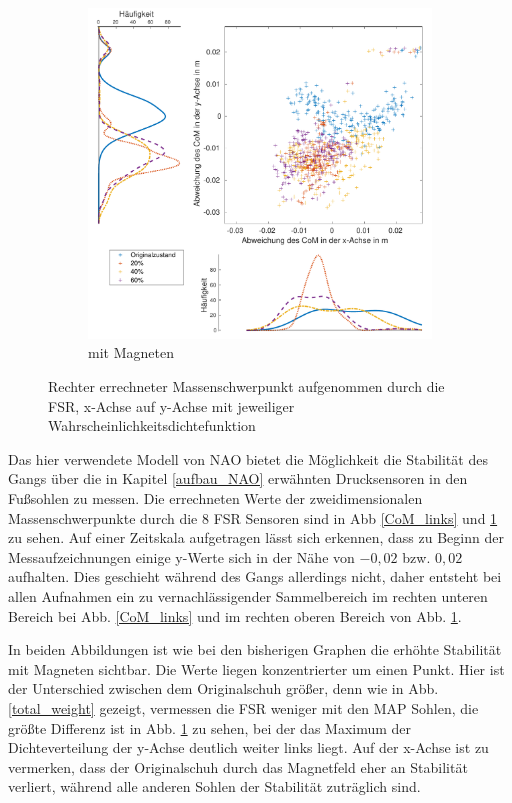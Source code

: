 \begin{figure}[tb]
\begin{adjustwidth}{-0.2\linewidth}{-0.2\linewidth}
\begin{subfigure}[c]{.45\linewidth}
			\includegraphics[width=\linewidth]{Bilder/rechts_CoM_mitM.pdf}
			\caption{mit Magneten}
			\vspace{5pt}
		\end{subfigure}
	\end{adjustwidth}
	\caption{Rechter errechneter Massenschwerpunkt aufgenommen durch die FSR, x-Achse auf y-Achse mit jeweiliger Wahrscheinlichkeitsdichtefunktion} \label{CoM_rechts}
\end{figure}
Das hier verwendete Modell von NAO bietet die Möglichkeit die Stabilität des Gangs über die in Kapitel \ref{aufbau_NAO} erwähnten Drucksensoren in den Fußsohlen zu messen. Die errechneten Werte der zweidimensionalen Massenschwerpunkte durch die 8 FSR Sensoren sind in Abb \ref{CoM_links} und \ref{CoM_rechts} zu sehen. Auf einer Zeitskala aufgetragen lässt sich erkennen, dass zu Beginn der Messaufzeichnungen einige y-Werte sich in der Nähe von $-0,02$ bzw. $0,02$ aufhalten. Dies geschieht während des Gangs allerdings nicht, daher entsteht bei allen Aufnahmen ein zu vernachlässigender Sammelbereich im rechten unteren Bereich bei Abb. \ref{CoM_links} und im rechten oberen Bereich von Abb. \ref{CoM_rechts}. 

In beiden Abbildungen ist wie bei den bisherigen Graphen die erhöhte Stabilität mit Magneten sichtbar. Die Werte liegen konzentrierter um einen Punkt. Hier ist der Unterschied zwischen dem Originalschuh größer, denn wie in Abb. \ref{total_weight} gezeigt, vermessen die FSR weniger mit den MAP Sohlen, die größte Differenz ist in Abb. \ref{CoM_rechts} zu sehen, bei der das Maximum der Dichteverteilung der y-Achse deutlich weiter links liegt. Auf der x-Achse ist zu vermerken, dass der Originalschuh durch das Magnetfeld eher an Stabilität verliert, während alle anderen Sohlen der Stabilität zuträglich sind.  

